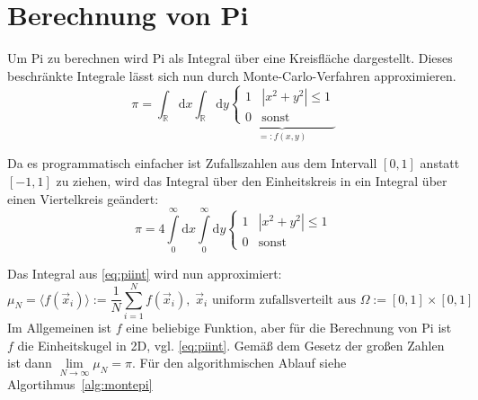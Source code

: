\section{Berechnung von Pi}

Um Pi zu berechnen wird Pi als Integral über eine Kreisfläche dargestellt. Dieses beschränkte Integrale lässt sich nun durch Monte-Carlo-Verfahren approximieren.
\begin{equation}
    \pi = \int_\mathbb{R} \mathrm{d}x
          \int_\mathbb{R} \mathrm{d}y
          \underbrace{\begin{cases}
              1 & |x^2+y^2| \leq 1\\
              0 & \text{sonst}
          \end{cases}}_{=:f(x,y)}
\end{equation}

Da es programmatisch einfacher ist Zufallszahlen aus dem Intervall $[0,1]$ anstatt $[-1,1]$ zu ziehen, wird das Integral über den Einheitskreis in ein Integral über einen Viertelkreis geändert:
\begin{equation}
    \label{eq:piint}
    \pi = 4 \int\limits_{0}^\infty \mathrm{d}x
            \int\limits_{0}^\infty \mathrm{d}y
            \begin{cases}1 & |x^2+y^2| \leq 1\\0 & \text{sonst} \end{cases}
\end{equation}


Das Integral aus \autoref{eq:piint} wird nun approximiert:
\begin{equation}
    \label{eq:pimonteint}
    \mu_N = \langle f\left( \vec{x}_i \right) \rangle
          := \frac{1}{N} \sum_{i=1}^N f\left( \vec{x}_i \right),\;
          \vec{x}_i \text{ uniform zufallsverteilt aus } \Omega:=[0,1]\times[0,1]
\end{equation}
Im Allgemeinen ist $f$ eine beliebige Funktion, aber für die Berechnung von Pi ist $f$ die Einheitskugel in 2D, vgl. \autoref{eq:piint}. Gemäß dem Gesetz der großen Zahlen ist dann $\lim\limits_{N\rightarrow \infty} \mu_N = \pi$. Für den algorithmischen Ablauf siehe Algortihmus~\ref{alg:montepi}

